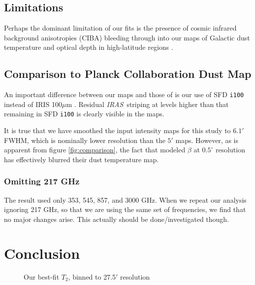 \documentclass{emulateapj}
\newcommand{\IRAS}{{\it IRAS}}
\begin{document}

\subsection{Limitations}
Perhaps the dominant limitation of our fits is the presence of cosmic
infrared background anisotropies (CIBA) bleeding through into our maps of 
Galactic dust temperature and optical depth in high-latitude regions 
\citep{ciba}.

\subsection{Comparison to Planck Collaboration Dust Map}
An important difference between our maps and those of \cite{planckdust} is our 
use of SFD \verb|i100| instead of IRIS 100$\mu$m \citep{IRIS}. Residual 
\IRAS~striping at levels higher than that remaining in SFD \verb|i100| is 
clearly visible in the \cite{planckdust} maps.

It is true that we have smoothed the input intensity maps for this study 
to $6.1'$ FWHM, which is nominally lower resolution than the $5'$ 
\cite{planckdust} maps. However, as is apparent from figure 
\ref{fig:comparison}, the fact that \cite{planckdust} modeled $\beta$ at 
$0.5^{\circ}$ resolution has effectively blurred their dust temperature map.


\subsubsection{Omitting 217 GHz}
The \cite{planckdust} result used only 353, 545, 857, and 3000 GHz. When we 
repeat our analysis ignoring 217 GHz, so that we are using the same
set of frequencies, we find that no major changes arise. This actually
should be done/investigated though.

\section{Conclusion}
\label{sec:conclusion}

\begin{figure*} [ht]
\begin{center}
\caption{Our best-fit $T_2$, binned to 27.5$'$ resolution}
\end{center}
\end{figure*}
\end{document}
